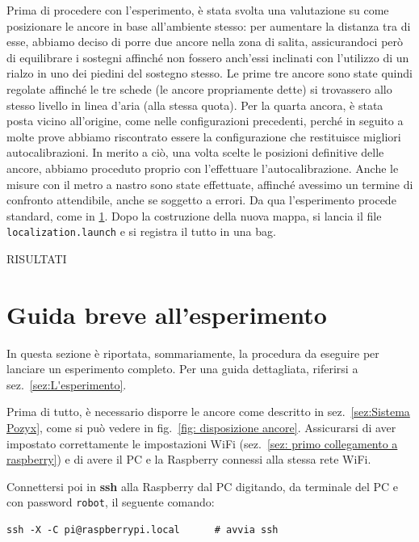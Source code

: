 Prima di procedere con l'esperimento, è stata svolta una valutazione su come posizionare le ancore in base all'ambiente stesso: per aumentare la distanza tra di esse, abbiamo deciso di porre due ancore nella zona di salita, assicurandoci però di equilibrare i sostegni affinché non fossero anch'essi inclinati con l'utilizzo di un rialzo in uno dei piedini del sostegno stesso. Le prime tre ancore sono state quindi regolate affinché le tre schede (le ancore propriamente dette) si trovassero allo stesso livello in linea d'aria (alla stessa quota). Per la quarta ancora, è stata posta vicino all'origine, come nelle configurazioni precedenti, perché in seguito a molte prove abbiamo riscontrato essere la configurazione che restituisce migliori autocalibrazioni. In merito a ciò, una volta scelte le posizioni definitive delle ancore, abbiamo proceduto proprio con l'effettuare l'autocalibrazione. Anche le misure con il metro a nastro sono state effettuate, affinché avessimo un termine di confronto attendibile, anche se soggetto a errori. Da qua l'esperimento procede standard, come in \ref{sez: Guida breve all'esperimento}. Dopo la costruzione della nuova mappa, si lancia il file \verb|localization.launch| e si registra il tutto in una bag.

RISULTATI


\newpage
\section{Guida breve all'esperimento}
\label{sez: Guida breve all'esperimento}
In questa sezione è riportata, sommariamente, la procedura da eseguire per lanciare un esperimento completo. Per una guida dettagliata, riferirsi a sez.~\ref{sez:L'esperimento}. 

Prima di tutto, è necessario disporre le ancore come descritto in sez.~\ref{sez:Sistema Pozyx}, come si può vedere in fig.~\ref{fig: disposizione ancore}. Assicurarsi di aver impostato correttamente le impostazioni WiFi (sez.~\ref{sez: primo collegamento a raspberry}) e di avere il PC e la Raspberry connessi alla stessa rete WiFi.


Connettersi poi in \textbf{ssh} alla Raspberry dal PC digitando, da terminale del PC e con password \texttt{robot}, il seguente comando:
\begin{lstlisting}[style=bashPC]
	ssh -X -C pi@raspberrypi.local		# avvia ssh
\end{lstlisting}

